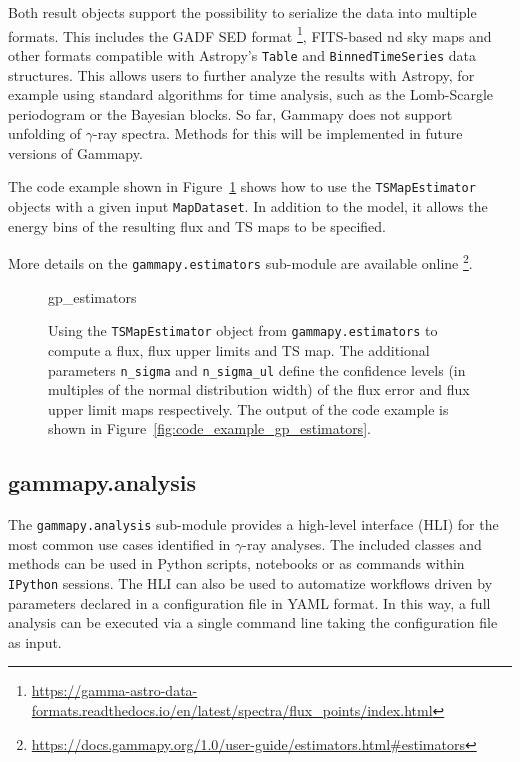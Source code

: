 \documentclass[longauth]{aa}
\newcommand{\code}[1]{\texttt{#1}}
\newcommand{\gammapy}{Gammapy\xspace}
\newcommand{\gammaray}{$\gamma$-ray\xspace}
\newcommand{\gadf}{GADF\xspace}
\begin{document}
Both result objects support the possibility to serialize
the data into multiple formats. This includes the
\gadf SED format \footnote{\url{https://gamma-astro-data-formats.readthedocs.io/en/latest/spectra/flux_points/index.html}},
FITS-based nd sky maps and other formats compatible with Astropy's \code{Table} and
\code{BinnedTimeSeries} data structures. This allows
users to further analyze the results with Astropy, for example using
standard algorithms for time analysis, such as
the Lomb-Scargle periodogram or the Bayesian
blocks. So far, \gammapy does not support unfolding of \gammaray spectra.
Methods for this will be implemented in future versions of \gammapy.

The code example shown in Figure~\ref{fig*:minted:gp_estimators} shows how to use
the \code{TSMapEstimator} objects with a given input \code{MapDataset}.
In addition to the model, it allows the energy
bins of the resulting flux and TS maps to be specified.

More details on the \code{gammapy.estimators} sub-module are available online \footnote{\url{https://docs.gammapy.org/1.0/user-guide/estimators.html\#estimators}}.

\begin{figure}
        \small
        {gp_estimators}
        \caption{Using the \code{TSMapEstimator} object from \code{gammapy.estimators} to compute a
         flux, flux upper limits and TS map. The additional parameters \code{n\_sigma}
        and \code{n\_sigma\_ul} define the confidence levels (in multiples of the normal distribution width)
        of the flux error and flux upper limit maps respectively. The output
                of the code example is shown in Figure~\ref{fig:code_example_gp_estimators}.
    }
    \label{fig*:minted:gp_estimators}
\end{figure}

\subsection{gammapy.analysis}
\label{ssec:gammapy-analysis}
The \code{gammapy.analysis} sub-module provides a high-level interface (HLI) for the most
common use cases identified in \gammaray analyses. The included classes and methods
 can be used in Python scripts, notebooks or as commands within \texttt{IPython}
sessions. The HLI can also be used to automatize
workflows driven by parameters declared in a configuration file in YAML format.
In this way, a full analysis can be executed via a single command line taking the
configuration file as input.
\end{document}
